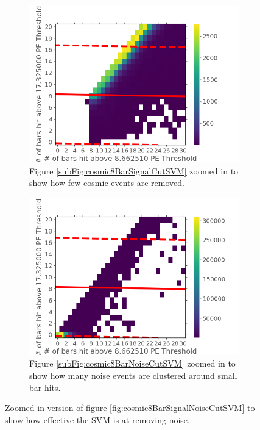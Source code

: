 \begin{figure}[htbp]
\centering
\begin{subfigure}{.5\textwidth}
  \centering
  \includegraphics[width=\linewidth]{Chapter5/Figs/Raster/Cosmic8BarSignalZoomCutSVM.png}
  \captionsetup{width=.9\linewidth}
  \caption{Figure \ref{subFig:cosmic8BarSignalCutSVM} zoomed in to show how few cosmic events are removed.} 
  \label{subFig:cosmic8BarSignalZoomCutSVM}
\end{subfigure}%
\begin{subfigure}{.5\textwidth}
  \centering
\includegraphics[width=\linewidth]{Chapter5/Figs/Raster/Cosmic8BarNoiseZoomCutSVM.png}
  \captionsetup{width=.9\linewidth}
  \caption{Figure \ref{subFig:cosmic8BarNoiseCutSVM} zoomed in to show how many noise events are clustered around small bar hits.}
  \label{subFig:Cosmic8BarNoiseZoomCutSVM}
\end{subfigure}
\caption{Zoomed in version of figure \ref{fig:cosmic8BarSignalNoiseCutSVM} to show how effective the SVM is at removing noise.}
\label{fig:Cosmic8BarSignalNoiseZoomCutSVM}
\end{figure}


